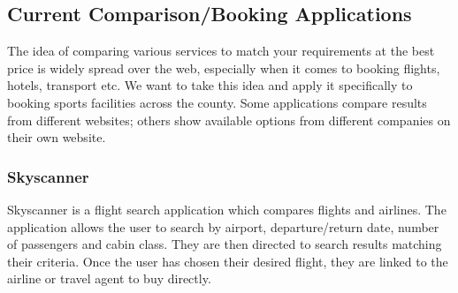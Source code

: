 \subsection{Current Comparison/Booking Applications}
\label{sub:current_comparison_applications}

The idea of comparing various services to match your requirements at the best
price is widely spread over the web, especially when it comes to booking
flights, hotels, transport etc.  We want to take this idea and apply it
specifically to booking sports facilities across the county.  Some applications
compare results from different websites; others show available options from
different companies on their own website.

\subsubsection{Skyscanner}
\label{ssub:skyscanner}

Skyscanner is a flight search application which compares flights and airlines.
The application allows the user to search by airport, departure/return date,
number of passengers and cabin class. They are then directed to search results
matching their criteria. Once the user has chosen their desired flight, they
are linked to the airline or travel agent to buy directly.


